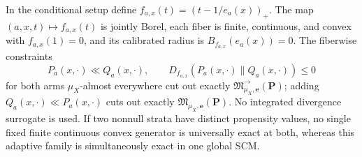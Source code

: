 In the conditional setup define \(f_{a,x}(t)=(t-1/e_a(x))_+\).  The map \((a,x,t)\mapsto f_{a,x}(t)\) is jointly Borel, each fiber is finite, continuous, and convex with \(f_{a,x}(1)=0\), and its calibrated radius is \(B_{f_{a,x}}(e_a(x))=0\).  The fiberwise constraints
\[
 P_a(x,\cdot)\ll Q_a(x,\cdot),\qquad
 D_{f_{a,x}}(P_a(x,\cdot)\|Q_a(x,\cdot))\le0
\]
for both arms \(\mu_X\)-almost everywhere cut out exactly \(\mathfrak M^{\to}_{\mu_X,\boldsymbol e}(\boldsymbol P)\); adding \(Q_a(x,\cdot)\ll P_a(x,\cdot)\) cuts out exactly \(\mathfrak M_{\mu_X,\boldsymbol e}(\boldsymbol P)\).  No integrated divergence surrogate is used.  If two nonnull strata have distinct propensity values, no single fixed finite continuous convex generator is universally exact at both, whereas this adaptive family is simultaneously exact in one global SCM.